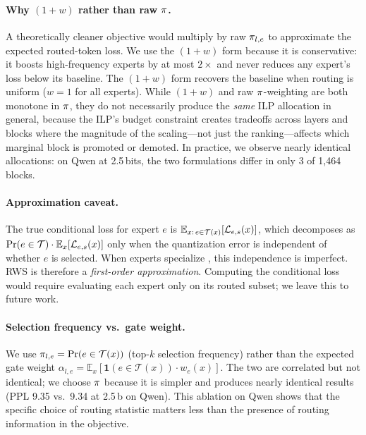 \paragraph{Why $(1 + w)$ rather than raw $\pi$.}
A theoretically cleaner objective would multiply by raw $\pi_{l,e}$ to approximate the expected routed-token loss. We use the $(1 + w)$ form because it is conservative: it boosts high-frequency experts by at most $2\times$ and never reduces any expert's loss below its baseline. The $(1 + w)$ form recovers the baseline when routing is uniform ($w\!=\!1$ for all experts). While $(1 + w)$ and raw $\pi$-weighting are both monotone in $\pi$, they do not necessarily produce the \emph{same} ILP allocation in general, because the ILP's budget constraint creates tradeoffs across layers and blocks where the magnitude of the scaling---not just the ranking---affects which marginal block is promoted or demoted. In practice, we observe nearly identical allocations: on Qwen at 2.5\,bits, the two formulations differ in only 3 of 1,464 blocks.

\paragraph{Approximation caveat.}
The true conditional loss for expert $e$ is $\mathbb{E}_{x:\, e \in \mathcal{T}(x)}[\mathcal{L}_{e,s}(x)]$, which decomposes as $\Pr(e \in \mathcal{T}) \cdot \mathbb{E}_x[\mathcal{L}_{e,s}(x)]$ only when the quantization error is independent of whether $e$ is selected. When experts specialize \citep{zhou2022expertchoice}, this independence is imperfect. RWS is therefore a \emph{first-order approximation}. Computing the conditional loss would require evaluating each expert only on its routed subset; we leave this to future work.

\paragraph{Selection frequency vs.\ gate weight.}
We use $\pi_{l,e} = \Pr(e \in \mathcal{T}(x))$ (top-$k$ selection frequency) rather than the expected gate weight $\alpha_{l,e} = \mathbb{E}_x[\mathbf{1}(e \in \mathcal{T}(x)) \cdot w_e(x)]$. The two are correlated but not identical; we choose $\pi$ because it is simpler and produces nearly identical results (PPL 9.35 vs.\ 9.34 at 2.5\,b on Qwen). This ablation on Qwen shows that the specific choice of routing statistic matters less than the presence of routing information in the objective.

